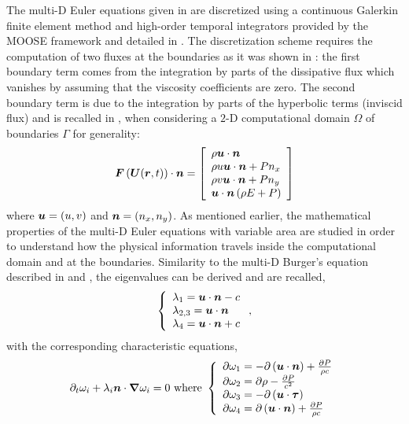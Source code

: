 The multi-D Euler equations given in  are discretized using a continuous Galerkin finite element method and high-order temporal integrators provided by the MOOSE framework and detailed in . The discretization scheme requires the computation of two fluxes at the boundaries as it was shown in : the first boundary term comes from the integration by parts of the dissipative flux which vanishes by assuming that the viscosity coefficients are zero. The second boundary term is due to the integration by parts of the hyperbolic terms (inviscid flux) and is recalled in , when considering a $2$-D computational domain $\Omega$ of boundaries $\Gamma$ for generality:
%
\begin{equation}\label{eq:hyp_flux_bc_sct3}
\boldsymbol F \left( \boldsymbol U(\boldsymbol r, t) \right) \cdot \boldsymbol n = 
\left[ 
\begin{array}{l}
\rho \boldsymbol u \cdot \boldsymbol n\\
\rho u \boldsymbol u \cdot \boldsymbol n + P n_x \\
\rho v \boldsymbol u \cdot \boldsymbol n + P n_y \\
\boldsymbol u \cdot \boldsymbol n \left( \rho E + P \right) 
\end{array}
\right]
\end{equation}
%
where $\boldsymbol u = \left( u , v \right)$ and $\boldsymbol n = \left( n_x, n _y \right)$. As mentioned earlier, the mathematical properties of the multi-D Euler equations with variable area are studied in order to understand how the physical information travels inside the computational domain and at the boundaries. Similarity to the multi-D Burger's equation described in  and , the eigenvalues can be derived \cite{Toro} and are recalled,
%
\begin{equation}\label{eq:eig_euler_2d_sct3}
\left\{
\begin{array}{l}
\lambda_1 = \boldsymbol u \cdot \boldsymbol n - c \\
\lambda_{2,3} = \boldsymbol u \cdot \boldsymbol n \\
\lambda_4 = \boldsymbol u \cdot \boldsymbol n + c \\
\end{array}
\right. ,
\end{equation}
%
with the corresponding characteristic equations,
%
\begin{equation}\label{eq:charac_euler_sct3}
\partial_t \omega_i + \lambda_i \boldsymbol n \cdot  \boldsymbol{\nabla} \omega_i = 0 \text{ where } 
\left\{
\begin{array}{l}
\partial \omega_1 = -\partial \left( \boldsymbol u \cdot \boldsymbol n \right) + \frac{\partial P}{\rho c}\\
\partial \omega_2 = \partial \rho - \frac{\partial P}{c^2} \\
\partial \omega_3 = -\partial \left( \boldsymbol u \cdot \boldsymbol\tau \right)\\
\partial \omega_4 = \partial \left( \boldsymbol u \cdot \boldsymbol n \right) + \frac{\partial P}{\rho c}\\
\end{array}
\right. 
\end{equation}
